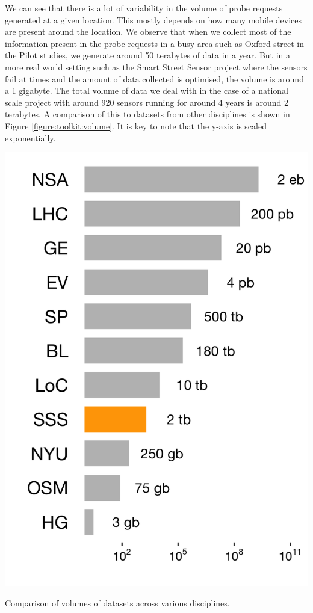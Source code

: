 
We can see that there is a lot of variability in the volume of probe requests generated at a given location.
This mostly depends on how many mobile devices are present around the location.
We observe that when we collect most of the information present in the probe requests in a busy area such as Oxford street in the Pilot studies, we generate around 50 terabytes of data in a year.
But in a more real world setting such as the Smart Street Sensor project where the sensors fail at times and the amount of data collected is optimised, the volume is around a 1 gigabyte.
The total volume of data we deal with in the case of a national scale project with around 920 sensors running for around 4 years is around 2 terabytes.
A comparison of this to datasets from other disciplines is shown in Figure \ref{figure:toolkit:volume}.
It is key to note that the y-axis is scaled exponentially.

\begin{marginfigure}
  \includegraphics{images/data-size-comparison.png}
  \caption{Comparison of volumes of datasets across various disciplines.}
  \label{figure:toolkit:volume}
\end{marginfigure}

